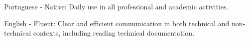 
\begin{cventries}
  \cventry
  {}
  {
    \begin{cvitems} %
      \item {Portuguese - Native: Daily use in all professional and academic activities.}
      \item {English - Fluent: Clear and efficient communication in both technical and non-technical contexts, including reading technical documentation.}
    \end{cvitems}
  }
  {} {} {}
\end{cventries}
